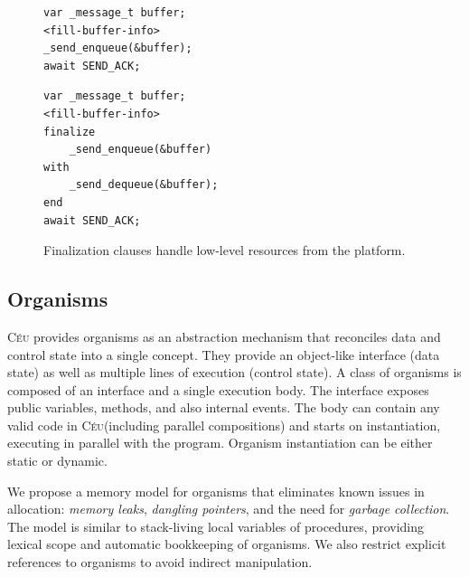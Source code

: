 \documentclass{acm_proc_article-sp}
\newcommand{\CEU}{\textsc{C\'{e}u}\xspace}
\newcommand{\1}{\;}
\newcommand{\2}{\;\;}
\newcommand{\3}{\;\;\;}
\newcommand{\5}{\;\;\;\;\;}
\begin{document}
\begin{figure}[t]
\begin{minipage}[t]{0.45\linewidth}
\begin{lstlisting}
var _message_t buffer;
<fill-buffer-info>
_send_enqueue(&buffer);
await SEND_ACK;
\end{lstlisting}
\end{minipage}
%
\begin{minipage}[t]{0.50\linewidth}
\begin{lstlisting}
var _message_t buffer;
<fill-buffer-info>
finalize
    _send_enqueue(&buffer)
with
    _send_dequeue(&buffer);
end
await SEND_ACK;
\end{lstlisting}
\end{minipage}
\caption{ Finalization clauses handle low-level resources from the platform.
\label{lst.fin}
}
\end{figure}

\subsection{Organisms}

\CEU provides organisms as an abstraction mechanism that reconciles data and 
control state into a single concept.
They provide an object-like interface (data state) as well as multiple lines of 
execution (control state).
%
A class of organisms is composed of an interface and a single execution body.  
The interface exposes public variables, methods, and also internal events.
The body can contain any valid code in \CEU (including parallel compositions) 
and starts on instantiation, executing in parallel with the program.
Organism instantiation can be either static or dynamic.

We propose a memory model for organisms that eliminates known issues in 
allocation: \emph{memory leaks}, \emph{dangling pointers}, and the need for 
\emph{garbage collection}.
%
The model is similar to stack-living local variables of procedures, providing 
lexical scope and automatic bookkeeping of organisms.
We also restrict explicit references to organisms to avoid indirect 
manipulation.
\end{document}
